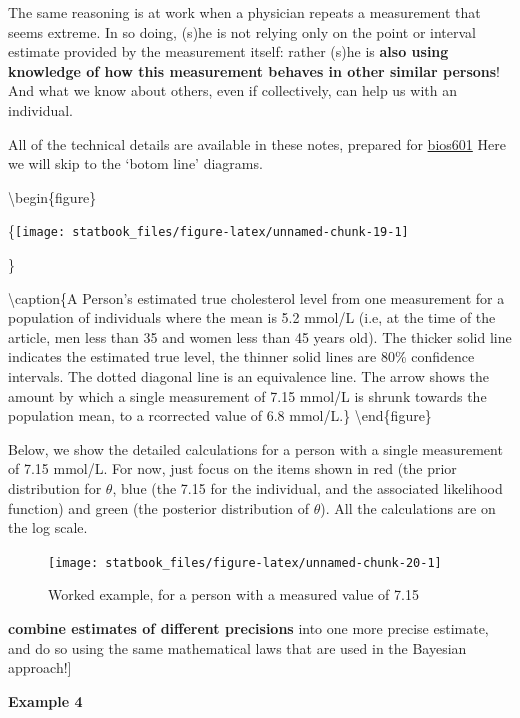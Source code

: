 \documentclass[]{book}
\begin{document}
The same reasoning is at work when a physician repeats a measurement that seems extreme. In so doing, (s)he is not relying only on the point or interval estimate provided by the measurement itself: rather (s)he is \textbf{also using knowledge of how this measurement behaves in other similar persons}! And what we know about others, even if collectively, can help us with an individual.

All of the technical details are available in these notes, prepared for \href{}{bios601}
Here we will skip to the `botom line' diagrams.

\textbackslash{}begin\{figure\}

\{\centering \texttt{[image: statbook\_files/figure-latex/unnamed-chunk-19-1]}

\}

\textbackslash{}caption\{A Person's estimated true cholesterol level from one measurement for a population of individuals where the mean is 5.2 mmol/L (i.e, at the time of the article, men less than 35 and women less than 45 years old). The thicker solid line indicates the estimated true level, the thinner solid lines are 80\% confidence intervals. The dotted diagonal line is an equivalence line. The arrow shows the amount by which a single measurement of 7.15 mmol/L is shrunk towards the population mean, to a rcorrected value of 6.8 mmol/L.\}\label{fig:unnamed-chunk-19}
\textbackslash{}end\{figure\}

Below, we show the detailed calculations for a person with a single measurement of 7.15 mmol/L. For now, just focus on the items shown in red (the prior distribution for \(\theta\), blue (the 7.15 for the individual, and the associated likelihood function) and green (the posterior distribution of \(\theta\)). All the calculations are on the log scale.

\begin{figure}

{\centering \texttt{[image: statbook\_files/figure-latex/unnamed-chunk-20-1]} 

}

\caption{Worked example, for a person with a measured value of 7.15}\label{fig:unnamed-chunk-20}
\end{figure}

\textbf{combine estimates of different precisions} into one more precise estimate, and do so using the same mathematical laws that are used in the Bayesian approach!{]}

\textbf{Example 4}
\end{document}
